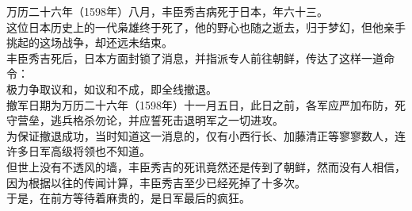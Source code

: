 \begin{multicols}{\theparacolNo}
万历二十六年（1598年）八月，丰臣秀吉病死于日本，年六十三。\\

这位日本历史上的一代枭雄终于死了，他的野心也随之逝去，归于梦幻，但他亲手挑起的这场战争，却还远未结束。\\

丰臣秀吉死后，日本方面封锁了消息，并指派专人前往朝鲜，传达了这样一道命令：\\

极力争取议和，如议和不成，即全线撤退。\\

撤军日期为万历二十六年（1598年）十一月五日，此日之前，各军应严加布防，死守营垒，逃兵格杀勿论，并应誓死击退明军之一切进攻。\\

为保证撤退成功，当时知道这一消息的，仅有小西行长、加藤清正等寥寥数人，连许多日军高级将领也不知道。\\

但世上没有不透风的墙，丰臣秀吉的死讯竟然还是传到了朝鲜，然而没有人相信，因为根据以往的传闻计算，丰臣秀吉至少已经死掉了十多次。\\

于是，在前方等待着麻贵的，是日军最后的疯狂。\\

\ifnum{}
	\end{multicols}
\fi
\newpage

